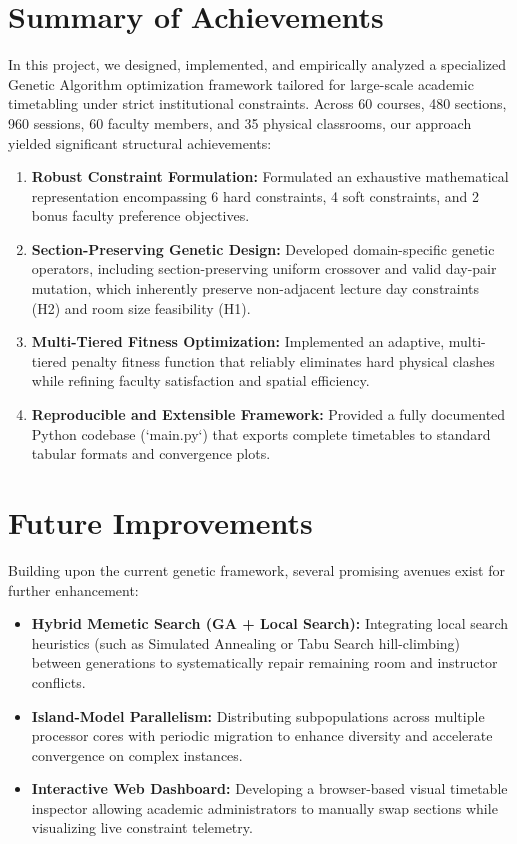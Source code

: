 \documentclass[12pt,a4paper]{report}
\begin{document}
\section{Summary of Achievements}
In this project, we designed, implemented, and empirically analyzed a specialized Genetic Algorithm optimization framework tailored for large-scale academic timetabling under strict institutional constraints. Across 60 courses, 480 sections, 960 sessions, 60 faculty members, and 35 physical classrooms, our approach yielded significant structural achievements:
\begin{enumerate}[leftmargin=1.5em]
  \item \textbf{Robust Constraint Formulation:} Formulated an exhaustive mathematical representation encompassing 6 hard constraints, 4 soft constraints, and 2 bonus faculty preference objectives.
  \item \textbf{Section-Preserving Genetic Design:} Developed domain-specific genetic operators, including section-preserving uniform crossover and valid day-pair mutation, which inherently preserve non-adjacent lecture day constraints (H2) and room size feasibility (H1).
  \item \textbf{Multi-Tiered Fitness Optimization:} Implemented an adaptive, multi-tiered penalty fitness function that reliably eliminates hard physical clashes while refining faculty satisfaction and spatial efficiency.
  \item \textbf{Reproducible and Extensible Framework:} Provided a fully documented Python codebase (`main.py`) that exports complete timetables to standard tabular formats and convergence plots.
\end{enumerate}

\section{Future Improvements}
Building upon the current genetic framework, several promising avenues exist for further enhancement:
\begin{itemize}[leftmargin=1.5em]
  \item \textbf{Hybrid Memetic Search (GA + Local Search):} Integrating local search heuristics (such as Simulated Annealing or Tabu Search hill-climbing) between generations to systematically repair remaining room and instructor conflicts.
  \item \textbf{Island-Model Parallelism:} Distributing subpopulations across multiple processor cores with periodic migration to enhance diversity and accelerate convergence on complex instances.
  \item \textbf{Interactive Web Dashboard:} Developing a browser-based visual timetable inspector allowing academic administrators to manually swap sections while visualizing live constraint telemetry.
\end{itemize}
\end{document}
